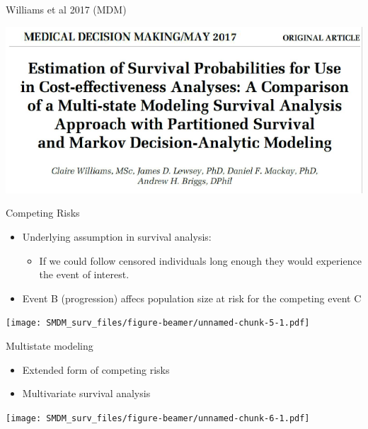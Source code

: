 \documentclass[
  ignorenonframetext,
]{beamer}
\providecommand{\tightlist}{%
  \setlength{\itemsep}{0pt}\setlength{\parskip}{0pt}}
\begin{document}
\begin{frame}

Williams et al 2017 (MDM)

\includegraphics[width=1\linewidth]{figures/williams2017}

\end{frame}

\begin{frame}{Competing Risks}
\protect\hypertarget{competing-risks}{}

\begin{itemize}
\tightlist
\item
  Underlying assumption in survival analysis:

  \begin{itemize}
  \tightlist
  \item
    If we could follow censored individuals long enough they would
    experience the event of interest.
  \end{itemize}
\item
  Event B (progression) affecs population size at risk for the competing
  event C
\end{itemize}

\end{frame}

\begin{frame}

\texttt{[image: SMDM\_surv\_files/figure-beamer/unnamed-chunk-5-1.pdf]}

\end{frame}

\begin{frame}{Multistate modeling}
\protect\hypertarget{multistate-modeling}{}

\begin{itemize}
\tightlist
\item
  Extended form of competing risks
\item
  Multivariate survival analysis
\end{itemize}

\texttt{[image: SMDM\_surv\_files/figure-beamer/unnamed-chunk-6-1.pdf]}

\end{frame}
\end{document}
